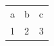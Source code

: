 \documentclass[reprint,amsmath,amssymb,aps]{revtex4-1}
\begin{document}
\begin{tabular}{m{1.25in}m{.85in}m{.75in}}
a & b & c \\
1 & 2 & 3\\
\end{tabular}
\end{document}
